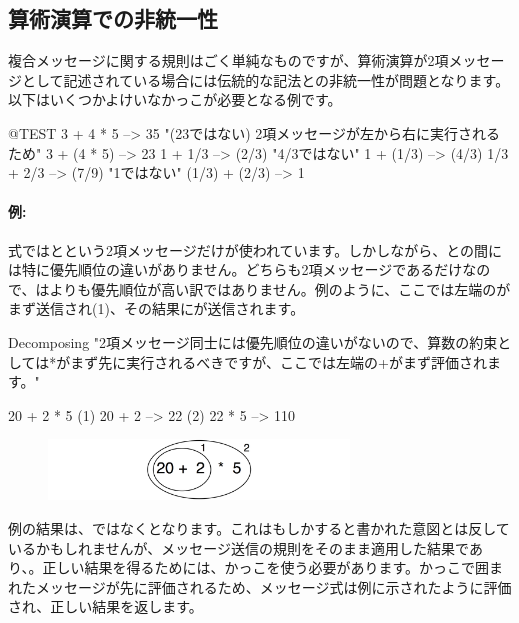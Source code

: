 \documentclass[a4paper,10pt,twoside]{book}
\begin{document}
\subsection{算術演算での非統一性}
複合メッセージに関する規則はごく単純なものですが、算術演算が2項メッセージとして記述されている場合には伝統的な記法との非統一性が問題となります。以下はいくつかよけいなかっこが必要となる例です。

\begin{code}{@TEST}
3 + 4 * 5      --> 35    "(23ではない)  2項メッセージが左から右に実行されるため"
3 + (4 * 5)    --> 23
1 + 1/3         --> (2/3)    "4/3ではない"
1 + (1/3)       --> (4/3)
1/3 + 2/3       --> (7/9)    "1ではない"
(1/3) + (2/3)  --> 1
\end{code}

\paragraph{例:}
式では\ct{+}と\ct{*}という2項メッセージだけが使われています。しかしながら、\ct{+}と\ct{*}の間には特に優先順位の違いがありません。どちらも2項メッセージであるだけなので、\ct{*}は\ct{+}よりも優先順位が高い訳ではありません。例のように、ここでは左端の\ct{+}がまず送信され(1)、その結果に\ct{*}が送信されます。

\begin{example}[binaryMessages1]{Decomposing }{}
"2項メッセージ同士には優先順位の違いがないので、算数の約束としては*がまず先に実行されるべきですが、ここでは左端の+がまず評価されます。"

      20 + 2 * 5 
(1)  20 + 2 --> 22
(2)  22       * 5 --> 110
\end{example}

\begin{figure}
\begin{center}\includegraphics[width=8cm]{ucompoNoBracketPar}\end{center}
\end{figure}
\noindent
例の結果は、ではなくとなります。これはもしかすると書かれた意図とは反しているかもしれませんが、メッセージ送信の規則をそのまま適用した結果であり、。正しい結果を得るためには、かっこを使う必要があります。かっこで囲まれたメッセージが先に評価されるため、メッセージ式は例に示されたように評価され、正しい結果を返します。
\end{document}
